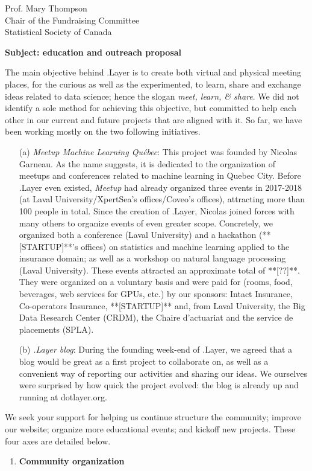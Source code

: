 \documentclass[11pt, a4paper]{letter} %
\begin{document}
\begin{letter}{
	Prof. Mary Thompson\\
	Chair of the Fundraising Committee\\
	Statistical Society of Canada
	
	\bigskip
	\textbf{Subject: education and outreach proposal}%
}
The main objective behind .Layer is to create both virtual and physical meeting places, for the curious as well as the experimented, to learn, share and exchange ideas related to data science; hence the slogan \emph{meet, learn, \& share}. We did not identify a sole method for achieving this objective, but committed to help each other in our current and future projects that are aligned with it. So far, we have been working mostly on the two following initiatives.
\begin{enumerate}
	\item[(a)] \emph{Meetup Machine Learning Québec}: This project was founded by Nicolas Garneau. As the name suggests, it is dedicated to the organization of meetups and conferences related to machine learning in Quebec City. Before .Layer even existed, \emph{Meetup} had already organized three events in 2017-2018 (at Laval University/XpertSea's offices/Coveo's offices), attracting more than 100 people in total. Since the creation of .Layer, Nicolas joined forces with many others to organize events of even greater scope. Concretely, we organized both a conference (Laval University) and a hackathon (**[STARTUP]**'s offices) on statistics and machine learning applied to the insurance domain; as well as a workshop on natural language processing (Laval University). These events attracted an approximate total of **[??]**. They were organized on a voluntary basis and were paid for (rooms, food, beverages, web services for GPUs, etc.) by our sponsors: Intact Insurance, Co-operators Insurance, **[STARTUP]** and, from Laval University, the Big Data Research Center (CRDM), the Chaire d'actuariat and the service de placements (SPLA).
	\item[(b)] \emph{.Layer blog}: During the founding week-end of .Layer, we agreed that a blog would be great as a first project to collaborate on, as well as a convenient way of reporting our activities and sharing our ideas. We ourselves were surprised by how quick the project evolved: the blog is already up and running at dotlayer.org.
\end{enumerate}

We seek your support for helping us continue structure the community; improve our website; organize more educational events; and kickoff new projects. These four axes are detailed below.

\begin{enumerate}
	\item \textbf{Community organization}
	

\end{enumerate}
\end{letter}
\end{document}
